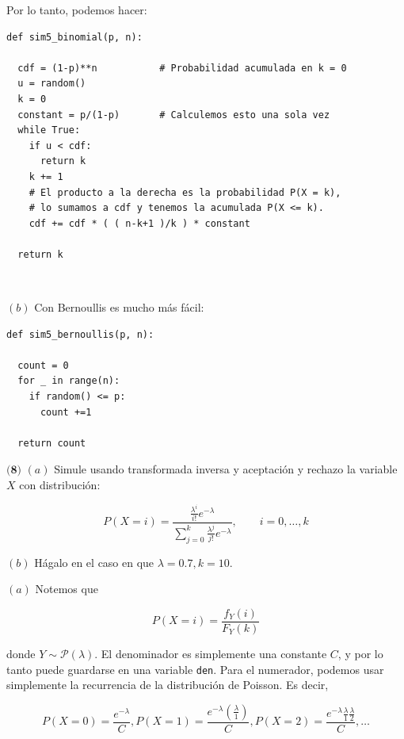 \documentclass[a4paper, 12pt]{article}
\begin{document}
Por lo tanto, podemos hacer:

\begin{verbatim}
def sim5_binomial(p, n):

  cdf = (1-p)**n           # Probabilidad acumulada en k = 0
  u = random()
  k = 0
  constant = p/(1-p)       # Calculemos esto una sola vez
  while True:
    if u < cdf:
      return k 
    k += 1
    # El producto a la derecha es la probabilidad P(X = k), 
    # lo sumamos a cdf y tenemos la acumulada P(X <= k).
    cdf += cdf * ( ( n-k+1 )/k ) * constant

  return k
\end{verbatim}

~ 

$(b)$ Con Bernoullis es mucho más fácil:

\begin{verbatim}
def sim5_bernoullis(p, n):

  count = 0 
  for _ in range(n):
    if random() <= p:
      count +=1

  return count
\end{verbatim}






\begin{myframe}
  $\textbf{(8)}$ $(a)$ Simule usando transformada inversa y aceptación y rechazo la variable
  $X$ con distribución:

  \begin{equation*}
    P(X = i) = \frac{ \frac{\lambda^i}{i!} e^{-\lambda} }{\sum_{j=0}^k
    \frac{\lambda^j}{j!}e^{-\lambda}}, \qquad i = 0, \ldots, k
  \end{equation*}

  $(b)$ Hágalo en el caso en que $\lambda =0.7, k = 10$.
\end{myframe}

$(a)$ Notemos que 

\begin{equation*}
  P(X = i) = \frac{f_Y(i)}{F_Y(k)}
\end{equation*}

donde $Y \sim \mathcal{P}(\lambda)$. El denominador es simplemente una constante
$C$,
y por lo tanto puede guardarse en una variable \texttt{den}. Para el numerador,
podemos usar simplemente la recurrencia de la distribución de Poisson. Es decir,

\begin{equation*}
  P(X = 0) = \frac{e^{-\lambda}}{C}, P(X=1) =
  \frac{e^{-\lambda}(\frac{\lambda}{1})}{C}, P(X=2) =
  \frac{e^{-\lambda}\frac{\lambda}{1} \frac{\lambda}{2}}{C}, \ldots
\end{equation*}
\end{document}

